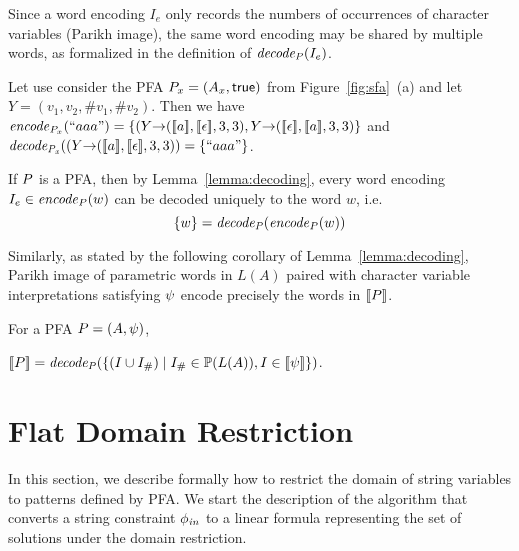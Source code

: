 \documentclass[sigplan,screen]{acmart}
\begin{document}
Since a word encoding $I_e$ only records the numbers of occurrences of character variables (Parikh image), 
the same word encoding may be shared by multiple words, as formalized in the definition of $\mathit{decode_{P}}(I_e)$. 

\begin{example}
Let use consider the PFA ${P_x}=(A_x,\mbox{$\mathsf{true}$})$ from Figure~\ref{fig:sfa}~(a) and let $Y{=}(v_1,v_2,\#v_1,\#v_2)$. Then we have\\
$\encode {\pa_x}( ``aaa" ) =\{ (Y{\rightarrow}(\semof{a},\semof{\epsilon},3,3), Y{\rightarrow}(\semof{\epsilon},\semof{a},3,3)  \}$ and
$\mathit{decode_{P_x}}((Y{\rightarrow}([\![a]\!],[\![\epsilon]\!],3,3))=\{``aaa"\} $.
\end{example}

If $P$ is a PFA, then by Lemma~\ref{lemma:decoding}, every word encoding $I_e\in \mathit{encode}_{P}( w )$ can be decoded uniquely to the word $w$, i.e.
$$
\{w\} = \mathit{decode_{P}} (\mathit{encode}_{P} (w))
$$

Similarly, as stated by the following corollary of Lemma~\ref{lemma:decoding}, 
Parikh image of parametric words in $L(A)$ paired with character variable interpretations satisfying $\psi$ encode precisely the words in $[\![P]\!]$.





\begin{corollary}\label{corollary:pfa}
For a PFA $P = (A,\psi)$,
\\
\centerline{$[\![P]\!] = \mathit{decode_{P}} (\{(I\cup I_{\#})\mid I_{\#}\in\mathbb{P}{(L(A))} ,I\in[\![\psi]\!]\})$.}
\end{corollary}

\section{Flat Domain Restriction}
\label{section:under_approximate}

%
In this section, we describe formally how to restrict the domain of string variables to patterns defined by PFA. 
We start the description of the algorithm that converts a string constraint $\phi_{\mathit{in}}$ to a linear formula representing the set of solutions under the domain restriction.  
%
\end{document}
